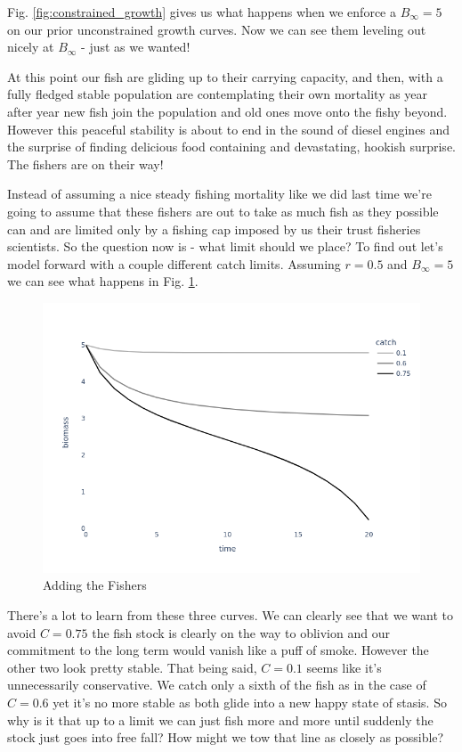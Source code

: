 \documentclass[11pt,a5paper]{book}
\begin{document}
Fig. \ref{fig:constrained_growth} gives us what happens when we enforce a $B_\infty = 5$ on our prior unconstrained growth curves. Now we can see them leveling out nicely at $B_\infty$ - just as we wanted!
\newline

At this point our fish are gliding up to their carrying capacity, and then, with a fully fledged stable population are contemplating their own mortality as year after year new fish join the population and old ones move onto the fishy beyond. However this peaceful stability is about to end in the sound of diesel engines and the surprise of finding delicious food containing and devastating, hookish surprise. The fishers are on their way!
\newline

Instead of assuming a nice steady fishing mortality like we did last time we're going to assume that these fishers are out to take as much fish as they possible can and are limited only by a fishing cap imposed by us their trust fisheries scientists. So the question now is - what limit should we place? To find out let's model forward with a couple different catch limits. Assuming $r=0.5$ and $B_\infty=5$ we can see what happens in Fig. \ref{fig:adding_the_fishers}.
\newline

\begin{figure}[h!] 
  \includegraphics[width=\linewidth]{notebooks/SurplusModels/adding_the_humans.png}
  \caption{Adding the Fishers}
  \label{fig:adding_the_fishers}
\end{figure}

There's a lot to learn from these three curves. We can clearly see that we want to avoid $C=0.75$ the fish stock is clearly on the way to oblivion and our commitment to the long term would vanish like a puff of smoke. However the other two look pretty stable. That being said, $C=0.1$ seems like it's unnecessarily conservative. We catch only a sixth of the fish as in the case of $C=0.6$ yet it's no more stable as both glide into a new happy state of stasis. So why is it that up to a limit we can just fish more and more until suddenly the stock just goes into free fall? How might we tow that line as closely as possible?
\newline
\end{document}
